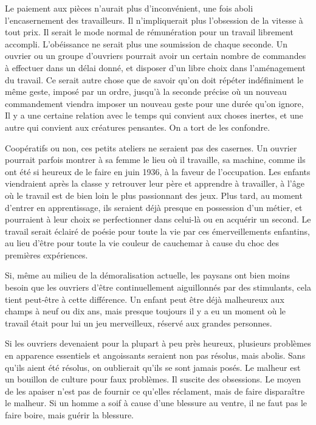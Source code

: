 \documentclass[french,twoside]{book} %
\begin{document}
Le paiement aux pièces n'aurait plus d'inconvénient, une fois aboli l'encasernement des travailleurs. Il n'impliquerait plus l'obsession de la vitesse à tout prix. Il serait le mode normal de rémunération pour un travail librement accompli. L'obéissance ne serait plus une soumission de chaque seconde. Un ouvrier ou un groupe d'ouvriers pourrait avoir un certain nombre de commandes à effectuer dans un délai donné, et disposer d'un libre choix dans l'aménagement du travail. Ce serait autre chose que de savoir qu'on doit répéter indéfiniment le même geste, imposé par un ordre, jusqu'à la seconde précise où un nouveau commandement viendra imposer un nouveau geste pour une durée qu'on ignore, Il y a une certaine relation avec le temps qui convient aux choses inertes, et une autre qui convient aux créatures pensantes. On a tort de les confondre.\par
Coopératifs ou non, ces petits ateliers ne seraient pas des casernes. Un ouvrier pourrait parfois montrer à sa femme le lieu où il travaille, sa machine, comme ils ont été si heureux de le faire en juin 1936, à la faveur de l'occupation. Les enfants viendraient après la classe y retrouver leur père et apprendre à travailler, à l'âge où le travail est de bien loin le plus passionnant des jeux. Plus tard, au moment d'entrer en apprentissage, ils seraient déjà presque en possession d'un métier, et pourraient à leur choix se perfectionner dans celui-là ou en acquérir un second. Le travail serait éclairé de poésie pour toute la vie par ces émerveillements enfantins, au lieu d'être pour toute la vie couleur de cauchemar à cause du choc des premières expériences.\par
Si, même au milieu de la démoralisation actuelle, les paysans ont bien moins besoin que les ouvriers d'être continuellement aiguillonnés par des stimulants, cela tient peut-être à cette différence. Un enfant peut être déjà malheureux aux champs à neuf ou dix ans, mais presque toujours il y a eu un moment où le travail était pour lui un jeu merveilleux, réservé aux grandes personnes.\par
Si les ouvriers devenaient pour la plupart à peu près heureux, plusieurs problèmes en apparence essentiels et angoissants seraient non pas résolus, mais abolis. Sans qu'ils aient été résolus, on oublierait qu'ils se sont jamais posés. Le malheur est un bouillon de culture pour faux problèmes. Il suscite des obsessions. Le moyen de les apaiser n'est pas de fournir ce qu'elles réclament, mais de faire disparaître le malheur. Si un homme a soif à cause d'une blessure au ventre, il ne faut pas le faire boire, mais guérir la blessure.\par
\end{document}
